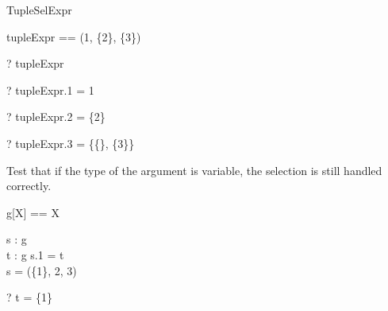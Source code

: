 \begin{zsection}
  \SECTION TupleSelExpr
\end{zsection}

\begin{zed}
  tupleExpr == (1, \{2\}, \power \{3\})
\end{zed}

\begin{zed}
  \vdash? tupleExpr \in \nat \cross \power \nat \cross \power \power \nat\\
\end{zed}
\begin{zed} \vdash? tupleExpr.1 = 1 \end{zed}
\begin{zed} \vdash? tupleExpr.2 = \{2\} \end{zed}
\begin{zed} \vdash? tupleExpr.3 = \{\{\}, \{3\}\} \end{zed}

Test that if the type of the argument is variable, the selection is 
still handled correctly.
\begin{zed}
  g[X] == X
\end{zed}

\begin{axdef}
  s : g\\
  t : g
\where
  s.1 = t\\
  s = (\{1\}, 2, 3)
\end{axdef}

\begin{zed} \vdash? t = \{1\} \end{zed}

